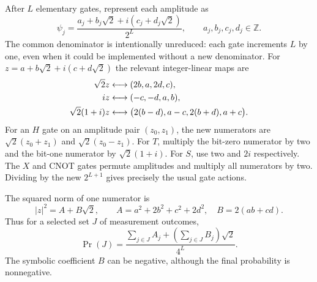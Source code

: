 \documentclass[11pt,letterpaper]{article}
\numberwithin{equation}{section}
\theoremstyle{definition}
\theoremstyle{remark}
\newcommand{\Z}{\mathbb Z}
\begin{document}
After $L$ elementary gates, represent each amplitude as
\begin{equation}\label{pqc:eq:ring}
 \psi_j=\frac{a_j+b_j\sqrt2+i(c_j+d_j\sqrt2)}{2^L},
 \qquad a_j,b_j,c_j,d_j\in\Z.
\end{equation}
The common denominator is intentionally unreduced: each gate increments
$L$ by one, even when it could be implemented without a new denominator.
For $z=a+b\sqrt2+i(c+d\sqrt2)$ the relevant integer-linear maps are
\begin{align}
 \sqrt2 z&\longleftrightarrow(2b,a,2d,c),\label{pqc:eq:linearquantum}\\
 iz&\longleftrightarrow(-c,-d,a,b),\notag\\
 \sqrt2(1+i)z&\longleftrightarrow
 \bigl(2(b-d),a-c,2(b+d),a+c\bigr).\notag
\end{align}
For an $H$ gate on an amplitude pair $(z_0,z_1)$, the new numerators are
$\sqrt2(z_0+z_1)$ and $\sqrt2(z_0-z_1)$. For $T$, multiply the bit-zero
numerator by two and the bit-one numerator by $\sqrt2(1+i)$.
For $S$, use two and $2i$ respectively. The $X$ and CNOT gates permute
amplitudes and multiply all numerators by two. Dividing by the new
$2^{L+1}$ gives precisely the usual gate actions.

The squared norm of one numerator is
\begin{equation}\label{pqc:eq:normquantum}
 |z|^2=A+B\sqrt2,\qquad
 A=a^2+2b^2+c^2+2d^2,\quad B=2(ab+cd).
\end{equation}
Thus for a selected set $J$ of measurement outcomes,
\begin{equation}\label{pqc:eq:probquantum}
 \Pr(J)=\frac{\sum_{j\in J}A_j+
                 (\sum_{j\in J}B_j)\sqrt2}{4^L}.
\end{equation}
The symbolic coefficient $B$ can be negative, although the final probability
is nonnegative.
\end{document}
